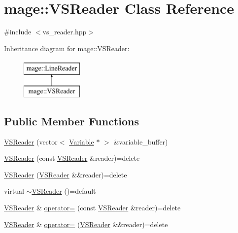 \hypertarget{classmage_1_1_v_s_reader}{}\section{mage\+:\+:V\+S\+Reader Class Reference}
\label{classmage_1_1_v_s_reader}


{\ttfamily \#include $<$vs\+\_\+reader.\+hpp$>$}

Inheritance diagram for mage\+:\+:V\+S\+Reader\+:\begin{figure}[H]
\begin{center}
\leavevmode
\includegraphics[height=2.000000cm]{classmage_1_1_v_s_reader}
\end{center}
\end{figure}
\subsection*{Public Member Functions}
\begin{DoxyCompactItemize}
\item 
\hyperlink{classmage_1_1_v_s_reader_a65aef6605c6104a0305937f231ef2106}{V\+S\+Reader} (vector$<$ \hyperlink{structmage_1_1_variable}{Variable} $\ast$ $>$ \&variable\+\_\+buffer)
\item 
\hyperlink{classmage_1_1_v_s_reader_aec7ec2ea03d5d77c5e78438a60263a73}{V\+S\+Reader} (const \hyperlink{classmage_1_1_v_s_reader}{V\+S\+Reader} \&reader)=delete
\item 
\hyperlink{classmage_1_1_v_s_reader_a84ba10ef4d308d94ea947155ab72d82a}{V\+S\+Reader} (\hyperlink{classmage_1_1_v_s_reader}{V\+S\+Reader} \&\&reader)=delete
\item 
virtual \hyperlink{classmage_1_1_v_s_reader_adb1dc76d802501476f1af285fe22369d}{$\sim$\+V\+S\+Reader} ()=default
\item 
\hyperlink{classmage_1_1_v_s_reader}{V\+S\+Reader} \& \hyperlink{classmage_1_1_v_s_reader_ab7d85956947e6b2a28650498573bc055}{operator=} (const \hyperlink{classmage_1_1_v_s_reader}{V\+S\+Reader} \&reader)=delete
\item 
\hyperlink{classmage_1_1_v_s_reader}{V\+S\+Reader} \& \hyperlink{classmage_1_1_v_s_reader_a2be1e0645e3496f71c2f2b7fcf98ba2a}{operator=} (\hyperlink{classmage_1_1_v_s_reader}{V\+S\+Reader} \&\&reader)=delete
\end{DoxyCompactItemize}
